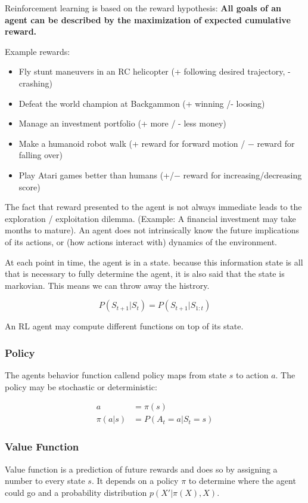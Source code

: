 \documentclass[main]{subfiles}
\begin{document}
Reinforcement learning is based on the reward hypothesis:
\textbf{All goals of an agent can be described by the maximization of expected cumulative reward.}

Example rewards:

\begin{itemize}
    \item Fly stunt maneuvers in an RC helicopter (+ following desired trajectory, - crashing)
    \item Defeat the world champion at Backgammon (+ winning /- loosing)
    \item Manage an investment portfolio (+ more / -  less money)
    \item Make a humanoid robot walk (+ reward for forward motion / − reward for falling over)
    \item Play Atari games better than humans (+/− reward for increasing/decreasing score)
\end{itemize}

The fact that reward presented to the agent is not always immediate leads to the exploration / exploitation dilemma. (Example: A financial investment may take months to mature). 
An agent does not intrinsically know the future implications of its actions, or (how actions interact with) dynamics of the environment.

At each point in time, the agent is in a state. because this information state is all that is necessary to fully determine the agent, it is also said that the state is markovian. This means we can throw away the histrory.

\begin{equation}
    P(S_{t+1}|S_t) = P(S_{t+1} | S_{1:t})
\end{equation}

An RL agent may compute different functions on top of its state.

\subsubsection{Policy}
The agents behavior function callend policy maps from state $s$ to action $a$. The policy may be stochastic or deterministic:

\begin{align}
    a & = \pi(s) \\
    \pi(a|s) & = P(A_t = a | S_t = s)
\end{align}

\subsubsection{Value Function}
Value function is a prediction of future rewards and does so by assigning a number to every state $s$. It depends on a policy $\pi$ to determine where the agent could go and a probability distribution $p(X'|\pi(X), X)$.
\end{document}
